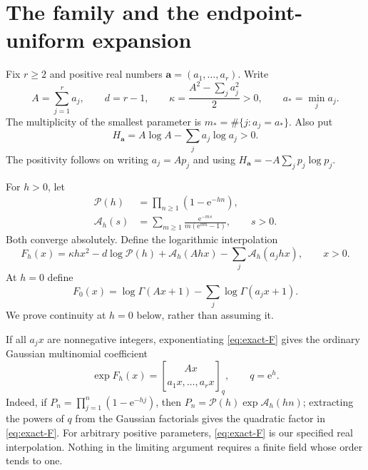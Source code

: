 \documentclass[11pt,a4paper]{article}
\numberwithin{equation}{section}
\theoremstyle{definition}\newtheorem{definition}[theorem]{Definition}
\theoremstyle{remark}\newtheorem{remark}[theorem]{Remark}
\newcommand{\e}{\mathrm e}
\newcommand{\avec}{\boldsymbol a}
\newcommand{\amin}{a_*}
\newcommand{\mmin}{m_*}
\newcommand{\calA}{\mathcal A}
\newcommand{\calP}{\mathcal P}
\newcommand{\qmulti}[2]{\genfrac{[}{]}{0pt}{}{#1}{#2}_{q}}
\begin{document}
\section{The family and the endpoint-uniform expansion}
\label{sec:definitions}

Fix $r\ge2$ and positive real numbers $\avec=(a_1,\ldots,a_r)$. Write
\begin{equation}
 A=\sum_{j=1}^r a_j,\qquad d=r-1,\qquad
 \kappa=\frac{A^2-\sum_j a_j^2}{2}>0,
 \qquad \amin=\min_j a_j.
 \label{eq:parameters}
\end{equation}
The multiplicity of the smallest parameter is
$\mmin=\#\{j:a_j=\amin\}$. Also put
\begin{equation}
 H_{\avec}=A\log A-\sum_j a_j\log a_j>0.
 \label{eq:entropy}
\end{equation}
The positivity follows on writing $a_j=A p_j$ and using
$H_{\avec}=-A\sum_j p_j\log p_j$.

For $h>0$, let
\begin{align}
 \calP(h)&=\prod_{n\ge1}(1-\e^{-hn}),\label{eq:product}\\
 \calA_h(s)&=\sum_{m\ge1}\frac{\e^{-ms}}{m(\e^{hm}-1)},
 \qquad s>0.\label{eq:tail}
\end{align}
Both converge absolutely. Define the logarithmic interpolation
\begin{equation}
 F_h(x)=\kappa h x^2-d\log\calP(h)
      +\calA_h(Ahx)-\sum_j\calA_h(a_jhx),\qquad x>0.
 \label{eq:exact-F}
\end{equation}
At $h=0$ define
\begin{equation}
 F_0(x)=\log\Gamma(Ax+1)-\sum_j\log\Gamma(a_jx+1).
 \label{eq:gamma-F}
\end{equation}
We prove continuity at $h=0$ below, rather than assuming it.

If all $a_jx$ are nonnegative integers, exponentiating \eqref{eq:exact-F}
gives the ordinary Gaussian multinomial coefficient
\begin{equation}
 \exp F_h(x)=\qmulti{Ax}{a_1x,\ldots,a_rx},\qquad q=\e^h.
 \label{eq:qmulti}
\end{equation}
Indeed, if $P_n=\prod_{j=1}^n(1-\e^{-hj})$, then
$P_n=\calP(h)\exp\calA_h(hn)$; extracting the powers of $q$ from the
Gaussian factorials gives the quadratic factor in \eqref{eq:exact-F}.
For arbitrary positive parameters, \eqref{eq:exact-F} is our specified real
interpolation. Nothing in the limiting argument requires a finite field whose
order tends to one.
\end{document}
